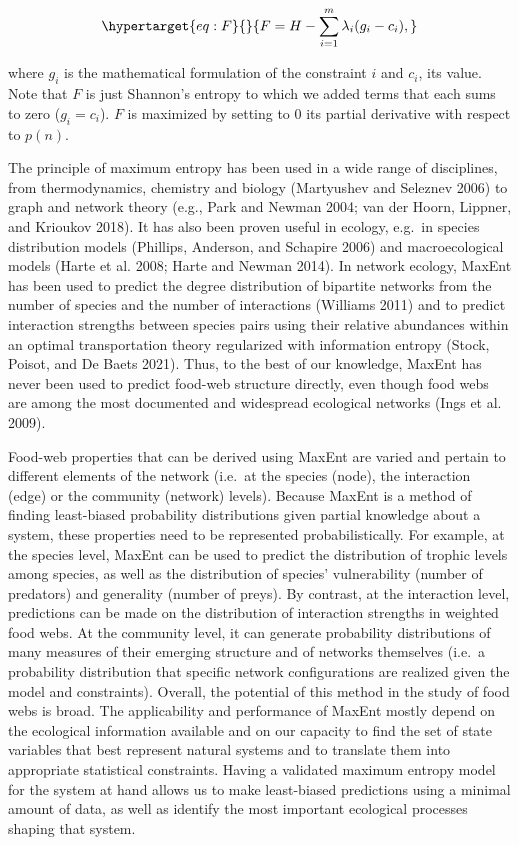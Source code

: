 \documentclass[10pt,oneside]{article}
\begin{document}
\begin{equation}\protect\hypertarget{eq:F}{}{F = H - \sum_{i=1}^m \lambda_i (g_i-c_i),}\label{eq:F}\end{equation}

where \(g_i\) is the mathematical formulation of the constraint \(i\)
and \(c_i\), its value. Note that \(F\) is just Shannon's entropy to
which we added terms that each sums to zero (\(g_i = c_i\)). \(F\) is
maximized by setting to \(0\) its partial derivative with respect to
\(p(n)\).

The principle of maximum entropy has been used in a wide range of
disciplines, from thermodynamics, chemistry and biology (Martyushev and
Seleznev 2006) to graph and network theory (e.g., Park and Newman 2004;
van der Hoorn, Lippner, and Krioukov 2018). It has also been proven
useful in ecology, e.g.~in species distribution models (Phillips,
Anderson, and Schapire 2006) and macroecological models (Harte et al.
2008; Harte and Newman 2014). In network ecology, MaxEnt has been used
to predict the degree distribution of bipartite networks from the number
of species and the number of interactions (Williams 2011) and to predict
interaction strengths between species pairs using their relative
abundances within an optimal transportation theory regularized with
information entropy (Stock, Poisot, and De Baets 2021). Thus, to the
best of our knowledge, MaxEnt has never been used to predict food-web
structure directly, even though food webs are among the most documented
and widespread ecological networks (Ings et al. 2009).

Food-web properties that can be derived using MaxEnt are varied and
pertain to different elements of the network (i.e.~at the species
(node), the interaction (edge) or the community (network) levels).
Because MaxEnt is a method of finding least-biased probability
distributions given partial knowledge about a system, these properties
need to be represented probabilistically. For example, at the species
level, MaxEnt can be used to predict the distribution of trophic levels
among species, as well as the distribution of species' vulnerability
(number of predators) and generality (number of preys). By contrast, at
the interaction level, predictions can be made on the distribution of
interaction strengths in weighted food webs. At the community level, it
can generate probability distributions of many measures of their
emerging structure and of networks themselves (i.e.~a probability
distribution that specific network configurations are realized given the
model and constraints). Overall, the potential of this method in the
study of food webs is broad. The applicability and performance of MaxEnt
mostly depend on the ecological information available and on our
capacity to find the set of state variables that best represent natural
systems and to translate them into appropriate statistical constraints.
Having a validated maximum entropy model for the system at hand allows
us to make least-biased predictions using a minimal amount of data, as
well as identify the most important ecological processes shaping that
system.
\end{document}
